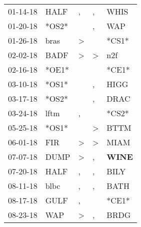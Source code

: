 \begin{supertabular}{p{0.07\textwidth}p{0.06\textwidth}p{0.02\textwidth}p{0.02\textwidth}p{0.06\textwidth}}
 01-14-18\textsuperscript{} &  HALF\textsuperscript{} &             , &             , &           WHIS\textsuperscript{} \\
 01-20-18\textsuperscript{} &                   *OS2* &               &             , &            WAP\textsuperscript{} \\
 01-26-18\textsuperscript{} &  bras\textsuperscript{} &  \textgreater &               &                            *CS1* \\
 02-02-18\textsuperscript{} &  BADF\textsuperscript{} &  \textgreater &  \textgreater &            n2f\textsuperscript{} \\
 02-16-18\textsuperscript{} &                   *OE1* &               &               &                            *CE1* \\
 03-10-18\textsuperscript{} &                   *OS1* &               &             , &           HIGG\textsuperscript{} \\
 03-17-18\textsuperscript{} &                   *OS2* &               &             , &           DRAC\textsuperscript{} \\
 03-24-18\textsuperscript{} &  lftm\textsuperscript{} &             , &               &                            *CS2* \\
 05-25-18\textsuperscript{} &                   *OS1* &               &  \textgreater &           BTTM\textsuperscript{} \\
 06-01-18\textsuperscript{} &   FIR\textsuperscript{} &  \textgreater &  \textgreater &           MIAM\textsuperscript{} \\
 07-07-18\textsuperscript{} &  DUMP\textsuperscript{} &  \textgreater &             , &  \textbf{WINE\textsuperscript{}} \\
 07-20-18\textsuperscript{} &  HALF\textsuperscript{} &             , &             , &           BILY\textsuperscript{} \\
 08-11-18\textsuperscript{} &  blbc\textsuperscript{} &             , &             , &           BATH\textsuperscript{} \\
 08-17-18\textsuperscript{} &  GULF\textsuperscript{} &             , &               &                            *CE1* \\
 08-23-18\textsuperscript{} &   WAP\textsuperscript{} &  \textgreater &             , &           BRDG\textsuperscript{} \\

\end{supertabular}
